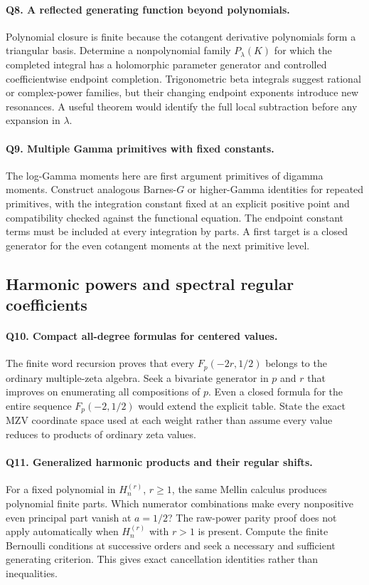 \paragraph{Q8. A reflected generating function beyond polynomials.}
Polynomial closure is finite because the cotangent derivative
polynomials form a triangular basis. Determine a nonpolynomial family
$P_\lambda(K)$ for which the completed integral has a holomorphic
parameter generator and controlled coefficientwise endpoint completion.
Trigonometric beta integrals suggest rational or complex-power
families, but their changing endpoint exponents introduce new
resonances. A useful theorem would identify the full local subtraction
before any expansion in $\lambda$.

\paragraph{Q9. Multiple Gamma primitives with fixed constants.}
The log-Gamma moments here are first argument primitives of digamma
moments. Construct analogous Barnes-$G$ or higher-Gamma identities
for repeated primitives, with the integration constant fixed at an
explicit positive point and compatibility checked against the
functional equation. The endpoint constant terms must be included
at every integration by parts. A first target is a closed generator
for the even cotangent moments at the next primitive level.

\subsection{Harmonic powers and spectral regular coefficients}

\paragraph{Q10. Compact all-degree formulas for centered values.}
The finite word recursion proves that every
$F_p(-2r,1/2)$ belongs to the ordinary multiple-zeta algebra.
Seek a bivariate generator in $p$ and $r$ that improves on enumerating
all compositions of $p$. Even a closed formula for the entire sequence
$F_p(-2,1/2)$ would extend the explicit table. State the exact MZV
coordinate space used at each weight rather than assume every value
reduces to products of ordinary zeta values.

\paragraph{Q11. Generalized harmonic products and their regular shifts.}
For a fixed polynomial in $H_n^{(r)}$, $r\ge1$, the same Mellin
calculus produces polynomial finite parts. Which numerator combinations
make every nonpositive even principal part vanish at $a=1/2$?
The raw-power parity proof does not apply automatically when
$H_n^{(r)}$ with $r>1$ is present. Compute the finite Bernoulli
conditions at successive orders and seek a necessary and sufficient
generating criterion. This gives exact cancellation identities rather
than inequalities.

